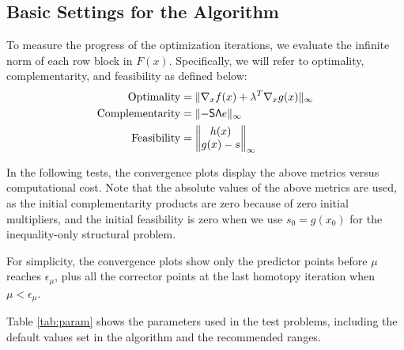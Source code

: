 \subsection{Basic Settings for the Algorithm}
To measure the progress of the optimization iterations, we evaluate the infinite
norm of each row block in $F(x)$. Specifically, we will refer to optimality,
complementarity, and feasibility as defined below:
\begin{align*}\label{eq:optfeas}
\text{Optimality} &= \lVert   \nabla_x f(x) + \lambda^T \nabla_x g(x)  \rVert _{\infty} \\
\text{Complementarity} &=  \lVert   -\mathsf{S}\mathsf{\Lambda} e   \rVert _{\infty}   \\
\text{Feasibility} &= \begin{Vmatrix} h(x) \\ g(x) - s  \end{Vmatrix} _{\infty} 
\end{align*}

In the following tests, the convergence plots display the above metrics versus
computational cost.  Note that the absolute values of the above metrics are used, 
as the initial complementarity products are zero because of zero initial multipliers, 
and the initial feasibility is zero when we use $s_0 = g(x_0)$ for the inequality-only 
structural problem. 

For simplicity, the convergence plots show only the
predictor points before $\mu$ reaches $\epsilon_\mu$, plus all the corrector
points at the last homotopy iteration when $\mu < \epsilon_{\mu}$.

Table \ref{tab:param} shows the parameters used in the test problems, including
the default values set in the algorithm and the recommended ranges.

